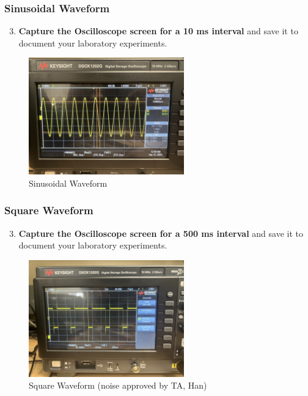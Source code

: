 \documentclass[12pt]{article}
\begin{document}
\subsubsection{Sinusoidal Waveform}
\begin{enumerate}
\setcounter{enumi}{2}
\item \textbf{Capture the Oscilloscope screen for a 10 ms interval} and save it to document your laboratory experiments.
\end{enumerate}
\begin{figure}[h]
    \centering
    \includegraphics[width=0.6\textwidth]{SineWaveform.jpeg}
    \caption{Sinusoidal Waveform}
    \label{fig:Sinusoidal-Waveform}
\end{figure}

\subsubsection{Square Waveform}
\begin{enumerate}
\setcounter{enumi}{2}
\item \textbf{Capture the Oscilloscope screen for a 500 ms interval} and save it to document your laboratory experiments.
\end{enumerate}
\begin{figure}[h]
    \centering
    \includegraphics[width=0.6\textwidth]{SquareWaveform.jpeg}
    \caption{Square Waveform (noise approved by TA, Han)}
    \label{fig:Square-Waveform}
\end{figure}
\end{document}
